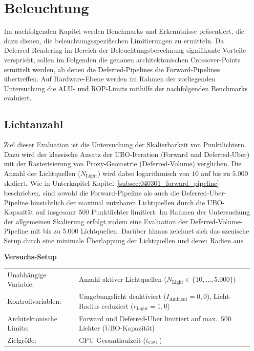 \section{{Beleuchtung}}
\label{sec:0504_lighting_eval}

Im nachfolgenden Kapitel werden Benchmarks und Erkenntnisse präsentiert, die dazu dienen, die beleuchtungsspezifischen
Limitierungen zu ermitteln.
Da Deferred Rendering im Bereich der Beleuchtungsberechnung signifikante Vorteile verspricht, sollen im Folgenden die
genauen architektonischen Crossover-Points ermittelt werden, ab denen die Deferred-Pipelines die Forward-Pipelines
übertreffen.
Auf Hardware-Ebene werden im Rahmen der vorliegenden Untersuchung die \ac{ALU}- und \ac{ROP}-Limits mithilfe der nachfolgenden
Benchmarks evaluiert.

\subsection{{Lichtanzahl}}
\label{subsec:050401_light_count_eval}

Ziel dieser Evaluation ist die Untersuchung der Skalierbarkeit von Punktlichtern.
Dazu wird der klassische Ansatz der \ac{UBO}-Iteration (Forward und Deferred-Uber) mit der Rasterisierung von
Proxy-Geometrie (Deferred-Volume) verglichen.
Die Anzahl der Lichtquellen ($N_{\text{Light}}$) wird dabei logarithmisch von $10$ auf bis zu $5.000$ skaliert.
Wie in Unterkapitel Kapitel~\ref{subsec:040301_forward_pipeline} beschrieben, sind sowohl die Forward-Pipeline
als auch die Deferred-Uber-Pipeline hinsichtlich der maximal nutzbaren Lichtquellen durch die
\ac{UBO}-Kapazität auf insgesamt 500 Punktlichter limitiert.
Im Rahmen der Untersuchung der allgemeinen Skalierung erfolgt zudem eine Evaluation der Deferred-Volume-Pipeline mit bis
zu $5.000$ Lichtquellen.
Darüber hinaus zeichnet sich das szenische Setup durch eine minimale Überlappung der Lichtquellen und deren Radien aus.

\begin{center}
    \small
    \colorbox{gray!5}{\parbox{0.95\textwidth}{
        \centering
        \vspace{2mm}
        {\sffamily\bfseries Versuchs-Setup} \\[1.5ex]
        \begin{tabularx}{0.9\textwidth}{>{\sffamily}l X}
            Unabhängige Variable:    & Anzahl aktiver Lichtquellen ($N_{\text{Light}} \in \{10, \dots, 5.000\}$) \\
            Kontrollvariablen: & Umgebungslicht deaktiviert ($I_{\text{Ambient}} = 0{,}0$), Licht-Radius
            reduziert ($r_{\text{Light}} = 1{,}0$) \\
            Architektonische Limits:   & Forward und Deferred-Uber limitiert auf max.\ 500 Lichter
            (\ac{UBO}-Kapazität) \\
            Zielgröße:               & \ac{GPU}-Gesamtlaufzeit ($t_{\text{GPU}}$)
        \end{tabularx}
        \vspace{2mm}
    }}
\end{center}

